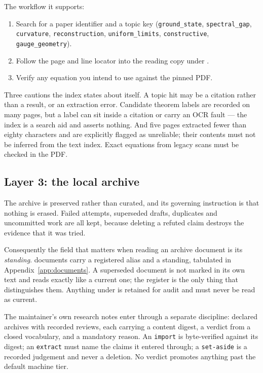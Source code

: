 The workflow it supports:

\begin{enumerate}
  \item Search  for a paper identifier and a topic
    key (\texttt{ground\_state}, \texttt{spectral\_gap},
    \texttt{curvature}, \texttt{reconstruction},
    \texttt{uniform\_limits}, \texttt{constructive},
    \texttt{gauge\_geometry}).
  \item Follow the page and line locator into the reading copy under
    .
  \item Verify any equation you intend to use against the pinned PDF.
\end{enumerate}

Three cautions the index states about itself. A topic hit may be a
citation rather than a result, or an extraction error. Candidate
theorem labels are recorded on many pages, but a label can sit inside a
citation or carry an OCR fault --- the index is a search aid and
asserts nothing. And five pages extracted fewer than eighty characters
and are explicitly flagged as unreliable; their contents must not be
inferred from the text index. Exact equations from legacy scans must be
checked in the PDF.

\subsection{Layer 3: the local archive}

The archive is preserved rather than curated, and its governing
instruction is that nothing is erased. Failed attempts, superseded
drafts, duplicates and uncommitted work are all kept, because deleting
a refuted claim destroys the evidence that it was tried.

Consequently the field that matters when reading an archive document is
its \emph{standing}. \AliasCount{} documents carry a registered alias
and a standing, tabulated in Appendix~\ref{app:documents}. A superseded
document is not marked in its own text and reads exactly like a current
one; the register is the only thing that distinguishes them. Anything
under  is retained for audit and must never
be read as current.

The maintainer's own research notes enter through a separate
discipline: \NoteArchives{} declared archives with \NoteReviews{}
recorded reviews, each carrying a content digest, a verdict from a
closed vocabulary, and a mandatory reason. An \texttt{import} is
byte-verified against its digest; an \texttt{extract} must name the
claims it entered through; a \texttt{set-aside} is a recorded judgement
and never a deletion. No verdict promotes anything past the default
machine tier.

